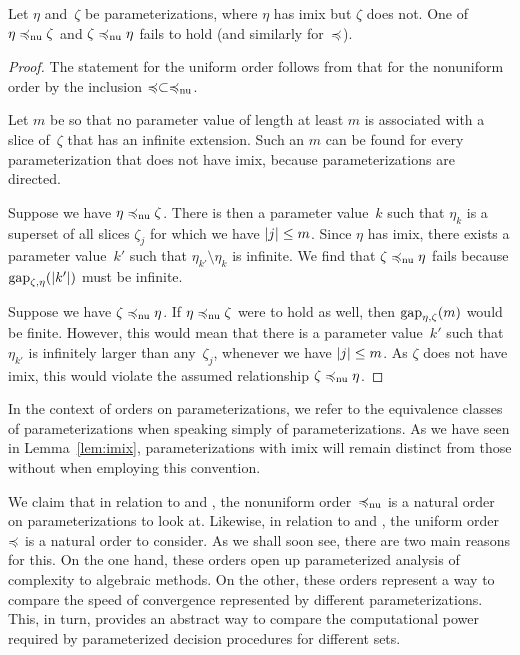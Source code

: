 \begin{lemma}
\label{lem:imix}%
  Let $\eta$ and~$\zeta$ be parameterizations, where $\eta$ has imix but $\zeta$ does not.
  One of $\eta \preccurlyeq_\mathrm{nu} \zeta$ and $\zeta \preccurlyeq_\mathrm{nu} \eta$ fails to hold (and similarly for~$\preccurlyeq$).
\end{lemma}
\begin{proof}
  The statement for the uniform order follows from that for the nonuniform order by the inclusion $\preccurlyeq \subset \preccurlyeq_\mathrm{nu}$.

  Let $m$ be so that no parameter value of length at least $m$ is associated with a slice of~$\zeta$ that has an infinite extension.
  Such an $m$ can be found for every parameterization that does not have imix, because parameterizations are directed.

  Suppose we have $\eta \preccurlyeq_\mathrm{nu} \zeta$.
  There is then a parameter value~$k$ such that $\eta_k$ is a superset of all slices $\zeta_j$ for which we have ${\lvert j\rvert} \le m$.
  Since $\eta$ has imix, there exists a parameter value~$k'$ such that $\eta_{k'} \setminus \eta_k$ is infinite.
  We find that $\zeta \preccurlyeq_\mathrm{nu} \eta$ fails because $\operatorname{gap}_{\zeta, \eta}({\lvert k'\rvert})$ must be infinite.

  Suppose we have $\zeta \preccurlyeq_\mathrm{nu} \eta$.
  If $\eta \preccurlyeq_\mathrm{nu} \zeta$ were to hold as well, then $\operatorname{gap}_{\eta, \zeta}(m)$ would be finite.
  However, this would mean that there is a parameter value~$k'$ such that $\eta_{k'}$ is infinitely larger than any~$\zeta_j$, whenever we have ${\lvert j\rvert} \le m$.
  As $\zeta$ does not have imix, this would violate the assumed relationship $\zeta \preccurlyeq_\mathrm{nu} \eta$.
\end{proof}

In the context of orders on parameterizations, we refer to the equivalence classes of parameterizations when speaking simply of parameterizations.
As we have seen in Lemma~\ref{lem:imix}, parameterizations with imix will remain distinct from those without when employing this convention.

We claim that in relation to  and , the nonuniform order~$\preccurlyeq_\mathrm{nu}$ is a natural order on parameterizations to look at.
Likewise, in relation to  and , the uniform order~$\preccurlyeq$ is a natural order to consider.
As we shall soon see, there are two main reasons for this.
On the one hand, these orders open up parameterized analysis of complexity to algebraic methods.
On the other, these orders represent a way to compare the speed of convergence represented by different parameterizations.
This, in turn, provides an abstract way to compare the computational power required by parameterized decision procedures for different sets.

